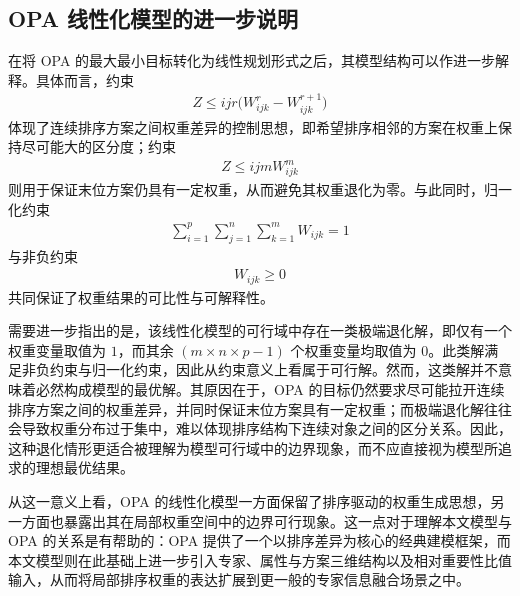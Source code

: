 \documentclass{article}
\begin{document}
\subsection{OPA 线性化模型的进一步说明}

在将 OPA 的最大最小目标转化为线性规划形式之后，其模型结构可以作进一步解释。具体而言，约束
\begin{align}
    Z\le ijr\bigl(W_{ijk}^{r}-W_{ijk}^{r+1}\bigr)
\end{align}
体现了连续排序方案之间权重差异的控制思想，即希望排序相邻的方案在权重上保持尽可能大的区分度；约束
\begin{align}
    Z\le ijmW_{ijk}^{m}
\end{align}
则用于保证末位方案仍具有一定权重，从而避免其权重退化为零。与此同时，归一化约束
\begin{align}
    \sum_{i=1}^{p}\sum_{j=1}^{n}\sum_{k=1}^{m}W_{ijk}=1
\end{align}
与非负约束
\begin{align}
    W_{ijk}\ge 0
\end{align}
共同保证了权重结果的可比性与可解释性。

需要进一步指出的是，该线性化模型的可行域中存在一类极端退化解，即仅有一个权重变量取值为 $1$，而其余 $\left(m\times n\times p-1\right)$ 个权重变量均取值为 $0$。此类解满足非负约束与归一化约束，因此从约束意义上看属于可行解。然而，这类解并不意味着必然构成模型的最优解。其原因在于，OPA 的目标仍然要求尽可能拉开连续排序方案之间的权重差异，并同时保证末位方案具有一定权重；而极端退化解往往会导致权重分布过于集中，难以体现排序结构下连续对象之间的区分关系。因此，这种退化情形更适合被理解为模型可行域中的边界现象，而不应直接视为模型所追求的理想最优结果。

从这一意义上看，OPA 的线性化模型一方面保留了排序驱动的权重生成思想，另一方面也暴露出其在局部权重空间中的边界可行现象。这一点对于理解本文模型与 OPA 的关系是有帮助的：OPA 提供了一个以排序差异为核心的经典建模框架，而本文模型则在此基础上进一步引入专家、属性与方案三维结构以及相对重要性比值输入，从而将局部排序权重的表达扩展到更一般的专家信息融合场景之中。
\end{document}

